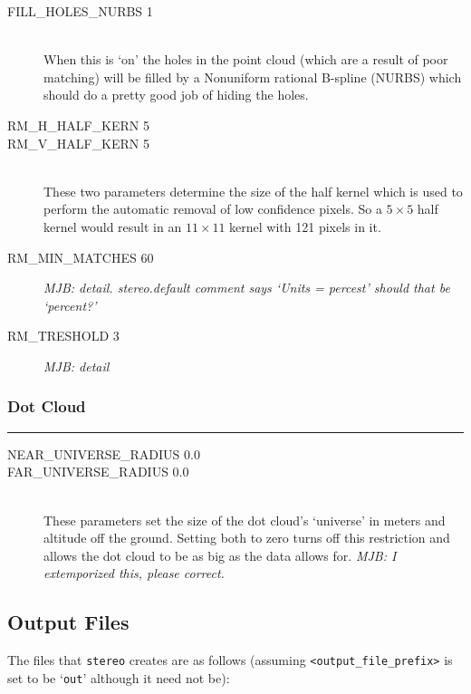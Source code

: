 \begin{description}

\item[FILL\_HOLES\_NURBS 1] \hfill \\
When this is `on' the holes in the point cloud (which are a result of poor matching) will be filled by a Nonuniform rational B-spline (NURBS) which should do a pretty good job of hiding the holes.

\item[RM\_H\_HALF\_KERN 5]
\item[RM\_V\_HALF\_KERN 5] \hfill \\
These two parameters determine the size of the half kernel which
is used to perform the automatic removal of low confidence pixels.
So a $5 \times 5$ half kernel would result in an $11 \times 11$
kernel with 121 pixels in it.

\item[RM\_MIN\_MATCHES 60]
\emph{MJB: detail.  stereo.default comment says `Units = percest'  should that be `percent?'}

\item[RM\_TRESHOLD 3]
\emph{MJB: detail}

\end{description}


\subsubsection*{Dot Cloud}
\hrule
\bigskip

\begin{description}
\item[NEAR\_UNIVERSE\_RADIUS 0.0]
\item[FAR\_UNIVERSE\_RADIUS 0.0] \hfill \\
These parameters set the size of the dot cloud's `universe' in meters and altitude off the ground.  Setting both to zero turns off this restriction and allows the dot cloud to be as big as the data allows for. \emph{MJB: I extemporized this, please correct.}

\end{description}

\subsection{Output Files}
The files that \verb=stereo= creates are as follows (assuming \verb=<output_file_prefix>= is set to be `\verb=out=' although it need not be):

